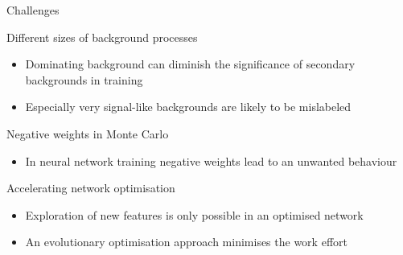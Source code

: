 \begin{frame}{Challenges}
    \begin{block}{Different sizes of background processes}
        \begin{itemize}
            \item Dominating background can diminish the significance of secondary backgrounds in training
            \item Especially very signal-like backgrounds are likely to be mislabeled
        \end{itemize}
    \end{block}
    \begin{block}{Negative weights in Monte Carlo}
        \begin{itemize}
            \item In neural network training negative weights lead to an unwanted behaviour
        \end{itemize}
    \end{block}
    \begin{block}{Accelerating network optimisation}
        \begin{itemize}
            \item Exploration of new features is only possible in an optimised network
            \item An evolutionary optimisation approach minimises the work effort
        \end{itemize}
    \end{block}
\end{frame}